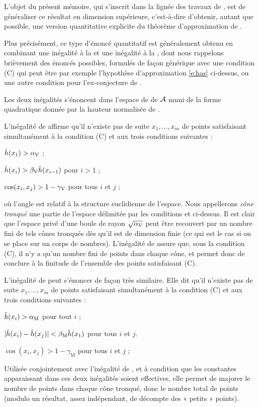 L'objet du présent mémoire, qui s'inscrit dans la lignée des travaux de
, est de généraliser ce résultat en dimension supérieure,
c'est-à-dire d'obtenir, autant que possible, une version quantitative
explicite du théorème d'approximation de .

\medskip

Plus précisément, ce type d'énoncé quantitatif est généralement obtenu en
combinant une inégalité à la  et une inégalité à la ,
dont nous rappelons brièvement des énoncés possibles, formulés de façon
générique avec une condition (C) qui peut être par exemple l'hypothèse
d'approximation \eqref{e:has} ci-dessus, ou une autre condition pour
l'ex-conjecture de .

Les deux inégalités s'énoncent dans l'espace de  de \( \mathcal A \)
muni de la forme quadratique donnée par la hauteur normalisée de
.

L'inégalité de  affirme qu'il n'existe pas de suite \( x_1, \dots,
  x_m \) de points satisfaisant simultanément à la condition (C) et aux trois
conditions suivantes :
\begin{enumthm}
  \item \( \hat h (x_1) > \alpha \sb{\mathrm{V}} \) ; \label{i:grand}
  \item \( \hat h (x_i) > \beta \sb{\mathrm{V}} \hat h (x_{i-1}) \) pour \( i > 1 \) ;
  \item \( \cos(x_i, x_j) > 1 - \gamma \sb{\mathrm{V}} \) pour tous \( i \) et \( j \) ;
    \label{i:proche}
\end{enumthm}
où l'angle est relatif à la structure euclidienne de l'espace. Nous
appellerons \emph{cône tronqué} une partie de l'espace délimitée par les
conditions  et  ci-dessus. Il est clair que
l'espace privé d'une boule de rayon \( \sqrt{\alpha \sb{\mathrm{V}}} \) peut être recouvert
par un nombre fini de tels cônes tronqués dès qu'il est de dimension finie (ce
qui est le cas si on se place sur un corps de nombres). L'inégalité de
 assure que, sous la condition (C), il n'y a qu'un nombre fini de
points dans chaque cône, et permet donc de conclure à la finitude de
l'ensemble des points satisfaisant (C).

L'inégalité de  peut s'énoncer de façon très similaire. Elle dit
qu'il n'existe pas de suite \( x_1, \dots, x_m \) de points satisfaisant
simultanément à la condition (C) et aux trois conditions suivantes :
\begin{enumthm}
  \newcommand\mum{_{\mathrm M}}
  \item \( \hautn{x_i} > \alpha\mum \) pour tout \( i \) ;
  \item \( \abs{ \hautn{x_i} - \hautn{x_j} } < \beta\mum \hautn{x_1} \) pour tous \( i \) et
    \( j \).
  \item \( \cos(x_i, x_j) > 1 - \gamma\mum \) pour tous \( i \) et \( j \) ;
\end{enumthm}
Utilisée conjointement avec l'inégalité de , et à condition que les
constantes apparaissant dans ces deux inégalités soient effectives, elle
permet de majorer le nombre de points dans chaque cône tronqué, donc le nombre
total de points (modulo un résultat, assez indépendant, de décompte des «
petits » points).

